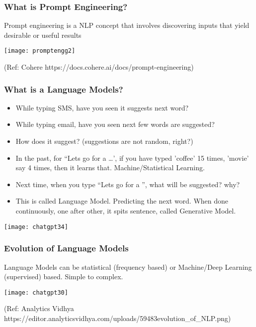 \begin{frame}[fragile]\frametitle{What is Prompt Engineering?}

Prompt engineering is a NLP concept that involves discovering inputs that yield desirable or useful results


\begin{center}
\texttt{[image: promptengg2]}

{\tiny (Ref: Cohere https://docs.cohere.ai/docs/prompt-engineering)}

\end{center}				
			
			

\end{frame}



\begin{frame}[fragile]\frametitle{What is a Language Models?}

\begin{itemize}
\item While typing SMS, have you seen it suggests next word?
\item While typing email, have you seen next few words are suggested?
\item How does it suggest? (suggestions are not random, right?)
\item In the past, for ``Lets go for a \ldots', if you have typed 'coffee' 15 times, 'movie' say 4 times, then it learns that. Machine/Statistical Learning.
\item Next time, when you type ``Lets go for a '', what will be suggested? why?
\item This is called Language Model. Predicting the next word. When done continuously, one after other, it spits sentence, called Generative Model.
\end{itemize}	

\begin{center}
\texttt{[image: chatgpt34]}
\end{center}		

\end{frame}

\begin{frame}[fragile]\frametitle{Evolution of Language Models}

Language Models can be statistical (frequency based) or Machine/Deep Learning (supervised) based. Simple to complex.

\begin{center}
\texttt{[image: chatgpt30]}
\end{center}				
{\tiny (Ref: Analytics Vidhya https://editor.analyticsvidhya.com/uploads/59483evolution\_of\_NLP.png)}

\end{frame}

